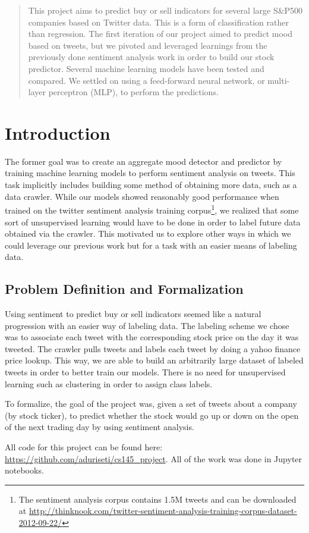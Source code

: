 \documentclass{sig-alternate-05-2015}
\begin{document}
\maketitle

	
	\begin{abstract}
		This project aims to predict buy or sell indicators for several large S\&P500 companies based on Twitter data. This is a form of classification rather than regression. The first iteration of our project aimed to predict mood based on tweets, but we pivoted and leveraged learnings from the previously done sentiment analysis work in order to build our stock predictor. Several machine learning models have been tested and compared. We settled on using a feed-forward neural network, or multi-layer perceptron (MLP), to perform the predictions.  
	\end{abstract}
	
	
	\section{Introduction}
	The former goal was to create an aggregate mood detector and predictor by training machine learning models to perform sentiment analysis on tweets. This task implicitly includes building some method of obtaining more data, such as a data crawler. While our models showed reasonably good performance when trained on the twitter sentiment analysis training corpus\footnote{The sentiment analysis corpus contains 1.5M tweets and can be downloaded at \url{http://thinknook.com/twitter-sentiment-analysis-training-corpus-dataset-2012-09-22/}}, we realized that some sort of unsupervised learning would have to be done in order to label future data obtained via the crawler. This motivated us to explore other ways in which we could leverage our previous work but for a task with an easier means of labeling data.
	\subsection{Problem Definition and Formalization}
	Using sentiment to predict buy or sell indicators seemed like a natural progression with an easier way of labeling data. The labeling scheme we chose was to associate each tweet with the corresponding stock price on the day it was tweeted. The crawler pulls tweets and labels each tweet by doing a yahoo finance price lookup. This way, we are able to build an arbitrarily large dataset of labeled tweets in order to better train our models. There is no need for unsupervised learning such as clustering in order to assign class labels.
	\par
	To formalize, the goal of the project was, given a set of tweets about a company (by stock ticker), to predict whether the stock would go up or down on the open of the next trading day by using sentiment analysis.
	\par
	All code for this project can be found here: \url{https://github.com/aduriseti/cs145_project}. All of the work was done in Jupyter notebooks.
\end{document}
